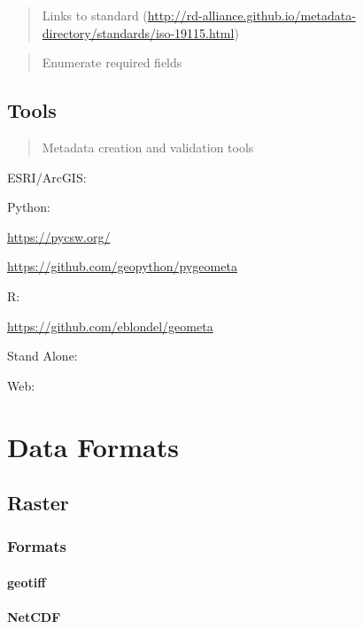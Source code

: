 \documentclass[
]{book}
\begin{document}
\begin{quote}
Links to standard (\url{http://rd-alliance.github.io/metadata-directory/standards/iso-19115.html})
\end{quote}

\begin{quote}
Enumerate required fields
\end{quote}

\hypertarget{tools}{%
\subsection{Tools}\label{tools}}

\begin{quote}
Metadata creation and validation tools
\end{quote}

ESRI/ArcGIS:

Python:

\url{https://pycsw.org/}

\url{https://github.com/geopython/pygeometa}

R:

\url{https://github.com/eblondel/geometa}

Stand Alone:

Web:

\hypertarget{data-formats}{%
\section{Data Formats}\label{data-formats}}

\hypertarget{raster}{%
\subsection{Raster}\label{raster}}

\hypertarget{formats}{%
\subsubsection{Formats}\label{formats}}

\hypertarget{geotiff}{%
\paragraph{geotiff}\label{geotiff}}

\hypertarget{netcdf}{%
\paragraph{NetCDF}\label{netcdf}}
\end{document}
